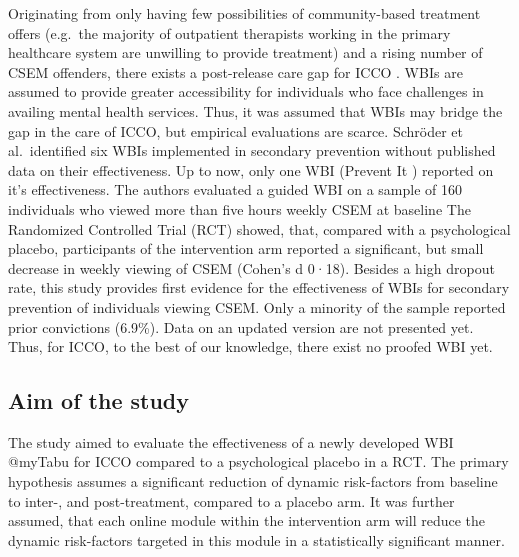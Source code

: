 \documentclass[
  super,
  preprint,
  1p,
  onecolumn]{elsarticle}
\begin{document}
Originating from only having few possibilities of community-based
treatment offers (e.g.~the majority of outpatient therapists working in
the primary healthcare system are unwilling to provide treatment) and a
rising number of CSEM offenders, there exists a post-release care gap
for ICCO .
\citep{schmidtOutpatientTherapistsPerspectives2022, baskurtMetaanalysisRecidivismRates2024}
WBIs are assumed to provide greater accessibility for individuals who
face challenges in availing mental health services.
\citep{crocamoDigitalHealthInterventions2025} Thus, it was assumed that
WBIs may bridge the gap in the care of ICCO, but empirical evaluations
are scarce.
\citep{wildWebBasedHealthServices2019, hillertWebBasedInitiativesPrevent2024, schroderWebBasedInterventionsIndividuals2023}
Schröder et al.~identified six WBIs implemented in secondary prevention
without published data on their effectiveness.
\citep{schroderWebBasedInterventionsIndividuals2023} Up to now, only one
WBI (Prevent It \citep{latthEffectsInternetdeliveredCognitive2022})
reported on it's effectiveness. The authors evaluated a guided WBI on a
sample of 160 individuals who viewed more than five hours weekly CSEM at
baseline \citep{latthChildSexualAbuse2025} The Randomized Controlled
Trial (RCT) showed, that, compared with a psychological placebo,
participants of the intervention arm reported a significant, but small
decrease in weekly viewing of CSEM (Cohen's d 0·18). Besides a high
dropout rate, this study provides first evidence for the effectiveness
of WBIs for secondary prevention of individuals viewing CSEM. Only a
minority of the sample reported prior convictions (6.9\%).
\citep{hillertWebBasedInitiativesPrevent2024, setoEvaluatingChildSexual2024}
Data on an updated version are not presented yet.
\citep{haubrockCriminalPolicePerceptions} Thus, for ICCO, to the best of
our knowledge, there exist no proofed WBI yet.

\subsection{Aim of the study}\label{aim-of-the-study}

The study aimed to evaluate the effectiveness of a newly developed WBI
@myTabu for ICCO compared to a psychological placebo in a RCT. The
primary hypothesis assumes a significant reduction of dynamic
risk-factors from baseline to inter-, and post-treatment, compared to a
placebo arm. It was further assumed, that each online module within the
intervention arm will reduce the dynamic risk-factors targeted in this
module in a statistically significant manner.
\end{document}
